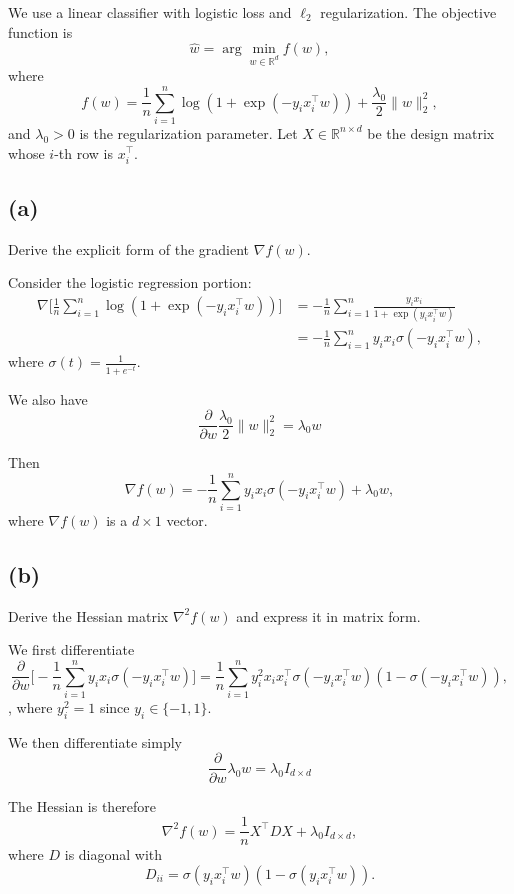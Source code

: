 \documentclass[11pt]{article}
\begin{document}
We use a linear classifier with logistic loss and $\ell_2$ regularization. The objective function is
\[
\hat{w} = \arg\min_{w \in \mathbb{R}^d} f(w),
\]
where
\[
f(w) = \frac{1}{n}\sum_{i=1}^n \log\left(1 + \exp(-y_i x_i^\top w)\right)
+ \frac{\lambda_0}{2}\|w\|_2^2,
\]
and $\lambda_0 > 0$ is the regularization parameter. Let
$X \in \mathbb{R}^{n \times d}$ be the design matrix whose $i$-th row is $x_i^\top$.

\subsection*{(a)}

Derive the explicit form of the gradient $\nabla f(w)$.

\hrulefill

Consider the logistic regression portion:
\begin{align*}
    \nabla \Bigg[ \frac{1}{n}\sum_{i=1}^n \log\left(1+\exp(-y_i x_i^\top w)\right) \Bigg] &= -\frac{1}{n}\sum_{i=1}^n
\frac{y_i x_i}{1+\exp(y_i x_i^\top w)} \\
&= -\frac{1}{n}\sum_{i=1}^n y_ix_i\sigma(-y_ix_i^\top w),
\end{align*}
where $\sigma(t)=\frac{1}{1+e^{-t}}$.

We also have
\[
\frac{\partial}{\partial w}\frac{\lambda_0}{2}\|w\|_2^2 = \lambda_0 w
\]

Then
\[
\nabla f(w) = -\frac{1}{n}\sum_{i=1}^n y_ix_i\sigma(-y_ix_i^\top w) + \lambda_0 w,
\]
where $\nabla f(w)$ is a $d \times 1$ vector.

\hrulefill

\subsection*{(b)}

Derive the Hessian matrix $\nabla^2 f(w)$ and express it in matrix form.

\hrulefill

We first differentiate
\[
\frac{\partial}{\partial w} \Bigg[-\frac{1}{n}\sum_{i=1}^n y_ix_i\sigma(-y_ix_i^\top w)\Bigg] = \frac{1}{n}\sum_{i=1}^n y_i^2x_ix_i^\top\sigma(-y_ix_i^\top w)(1-\sigma(-y_ix_i^\top w)),
\],
where $y_i^2 = 1$ since $y_i \in \{-1,1\}$.

We then differentiate simply
\[
\frac{\partial}{\partial w} \lambda_0 w = \lambda_0 I_{d\times d}
\]

The Hessian is therefore
\[
\nabla^2 f(w)
= \frac{1}{n} X^\top D X + \lambda_0 I_{d\times d},
\]
where $D$ is diagonal with
\[
D_{ii} = \sigma(y_ix_i^\top w)(1-\sigma(y_ix_i^\top w)).
\]
\end{document}
